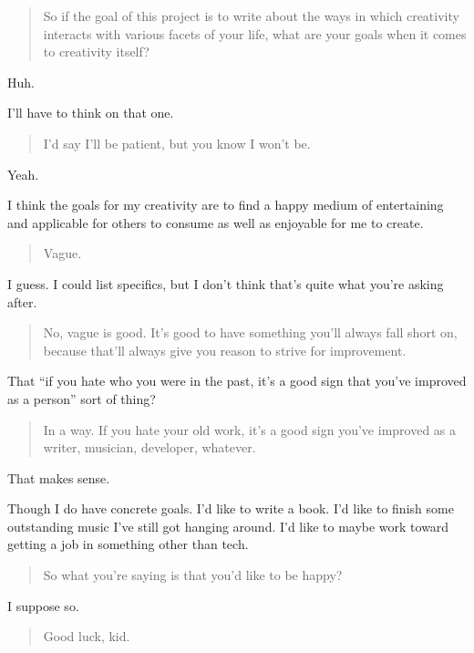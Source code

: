 \begin{quote}
So if the goal of this project is to write about the ways in which creativity interacts with various facets of your life, what are your goals when it comes to creativity itself?
\end{quote}

Huh.

I'll have to think on that one.

\begin{quote}
I'd say I'll be patient, but you know I won't be.
\end{quote}

Yeah.

I think the goals for my creativity are to find a happy medium of entertaining and applicable for others to consume as well as enjoyable for me to create.

\begin{quote}
Vague.
\end{quote}

I guess. I could list specifics, but I don't think that's quite what you're asking after.

\begin{quote}
No, vague is good. It's good to have something you'll always fall short on, because that'll always give you reason to strive for improvement.
\end{quote}

That ``if you hate who you were in the past, it's a good sign that you've improved as a person'' sort of thing?

\begin{quote}
In a way. If you hate your old work, it's a good sign you've improved as a writer, musician, developer, whatever.
\end{quote}

That makes sense.

Though I do have concrete goals. I'd like to write a book. I'd like to finish some outstanding music I've still got hanging around. I'd like to maybe work toward getting a job in something other than tech.

\begin{quote}
So what you're saying is that you'd like to be happy?
\end{quote}

I suppose so.

\begin{quote}
Good luck, kid.
\end{quote}

